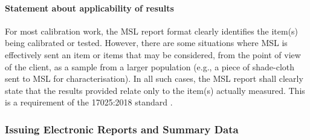 \paragraph{Statement about applicability of results}
For most calibration work, the MSL report format clearly identifies the item(s) being calibrated or tested. However, there are some situations where MSL is effectively sent an item or items that may be considered, from the point of view of the client, as a sample from a larger population (e.g., a piece of shade-cloth sent to MSL for characterisation). In all such cases, the MSL report shall clearly state that the results provided relate only to the item(s) actually measured. This is a requirement of the 17025:2018 standard \cite[clause 7.8.2.1~(l)]{ISO_17025}.      

\subsubsection{Issuing Electronic Reports and Summary Data}
\label{sss:issuing_electronic_reports}
